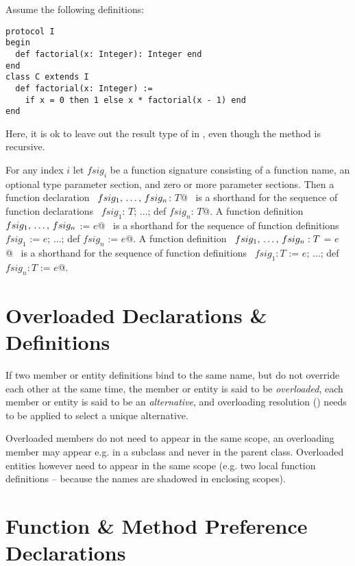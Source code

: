 \example Assume the following definitions:
\begin{lstlisting}
protocol I
begin
  def factorial(x: Integer): Integer end
end
class C extends I
  def factorial(x: Integer) :=
    if x = 0 then 1 else x * factorial(x - 1) end
end
\end{lstlisting}
Here, it is ok to leave out the result type of \lstinline@factorial@
in \lstinline@C@, even though the method is recursive. 

For any index $i$ let $fsig_i$ be a function signature consisting of a function
name, an optional type parameter section, and zero or more parameter
sections. Then a function declaration 
~\lstinline@def $fsig_1 ,\, \ldots ,\, fsig_n$: $T$@~ 
is a shorthand for the sequence of function
declarations ~\lstinline@def $fsig_1$: $T$; $\ldots$; def $fsig_n$: $T$@.  
A function definition ~\lstinline@def $fsig_1 ,\, \ldots ,\, fsig_n$ := $e$@~ is a
shorthand for the sequence of function definitions 
~\lstinline@def $fsig_1$ := $e$; $\ldots$; def $fsig_n$ := $e$@.  
A function definition
~\lstinline@def $fsig_1 ,\, \ldots ,\, fsig_n: T$ = $e$@~ is a shorthand for the
sequence of function definitions 
~\lstinline@def $fsig_1: T$ := $e$; $\ldots$; def $fsig_n: T$ := $e$@.






\section{Overloaded Declarations \& Definitions}
\label{sec:overloaded-definitions}

If two member or entity definitions bind to the same name, but do not override each other at the same time, the member or entity is said to be {\em overloaded}, each member or entity is said to be an {\em alternative}, and overloading resolution () needs to be applied to select a unique alternative. 

Overloaded members do not need to appear in the same scope, an overloading member may appear e.g. in a subclass and never in the parent class. Overloaded entities however need to appear in the same scope (e.g. two local function definitions -- because the names are shadowed in enclosing scopes). 






\section{Function \& Method Preference Declarations}
\label{sec:func-method-preference-decl}

